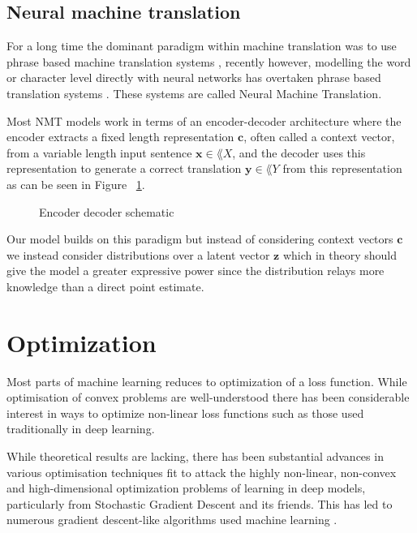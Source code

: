 \subsection{Neural machine translation}
For a long time the dominant paradigm within machine translation was to use
phrase based machine translation systems \cite{Koehn:2003:SPT:1073445.1073462,
  Koehn:2007:MOS:1557769.1557821}, recently however, modelling the word or
character level directly with neural networks has overtaken phrase based
translation systems \cite{wolk_neural-based_2015, wu_googles_2016}. These
systems are called Neural Machine Translation.

Most NMT models work in terms of an encoder-decoder architecture where the
encoder extracts a fixed length representation $\bm{c}$, often called a context
vector, from a variable length input sentence $\bm{x} \in \lang{X}$, and the
decoder uses this representation to generate a correct translation $\bm{y} \in
\lang{Y}$ from this representation \cite{cho_properties_2014} as can be seen in
Figure ~\ref{fig:encoder_decoder}.

\begin{figure}[H]
    \caption{Encoder decoder schematic}
  \label{fig:encoder_decoder}
\end{figure}

Our model builds on this paradigm but instead of considering context vectors
$\bm{c}$ we instead consider distributions over a latent vector $\bm{z}$ which
in theory should give the model a greater expressive power since the
distribution relays more knowledge than a direct point estimate.

\section{Optimization}

Most parts of machine learning reduces to optimization of a loss function. While
optimisation of convex problems are well-understood there has been considerable
interest in ways to optimize non-linear loss functions such as those used
traditionally in deep learning.

While theoretical results are lacking, there has been substantial
advances in various optimisation techniques fit to attack the highly non-linear,
non-convex and high-dimensional optimization problems of learning in deep
models, particularly from Stochastic Gradient Descent and its friends. This has
led to numerous gradient descent-like algorithms used machine learning
\cite{Ruder17}.


